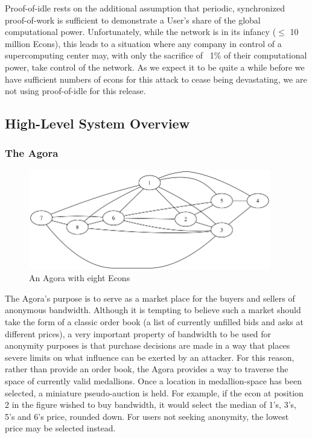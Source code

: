 \documentclass{article}
\begin{document}
Proof-of-idle rests on the additional assumption that periodic, synchronized proof-of-work is sufficient to demonstrate a User’s share of the global computational power. Unfortunately, while the network is in its infancy ($\leq$ 10 million Econs), this leads to a situation where any company in control of a supercomputing center may, with only the sacrifice of ~1\% of their computational power, take control of the network. As we expect it to be quite a while before we have sufficient numbers of econs for this attack to cease being devastating, we are not using proof-of-idle for this release.

\subsection{High-Level System Overview}

\subsubsection{The Agora}

\begin{figure}[htbp]
  \centering
  \includegraphics[width = 300pt]{agoraOverview}
  \caption{An Agora with eight Econs}
\end{figure}

The Agora’s purpose is to serve as a market place for the buyers and sellers of anonymous bandwidth. Although it is tempting to believe such a market should take the form of a classic order book (a list of currently unfilled bids and asks at different prices), a very important property of bandwidth to be used for anonymity purposes is that purchase decisions are made in a way that places severe limits on what influence can be exerted by an attacker. For this reason, rather than provide an order book, the Agora provides a way to traverse the space of currently valid medallions. Once a location in medallion-space has been selected, a miniature pseudo-auction is held. For example, if the econ at position 2 in the figure wished to buy bandwidth, it would select the median of 1’s, 3’s, 5’s and 6’s price, rounded down. For users not seeking anonymity, the lowest price may be selected instead.
\end{document}
